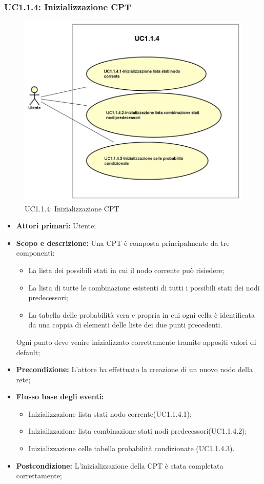 \subsubsection{UC1.1.4: Inizializzazione CPT} 
\begin{figure} [H]
	\centering
	\includegraphics[scale=0.45]{Img/UC1-1-4} 
	\caption{UC1.1.4: Inizializzazione CPT} \label{} 
\end{figure} 
\begin{itemize} 
	\item{\textbf{Attori primari:} Utente;} 
	\item{\textbf{Scopo e descrizione:} Una CPT è composta principalmente da tre componenti: 
		\begin{itemize} 
			\item{La lista dei possibili stati in cui il nodo corrente può risiedere;} 
			\item{La lista di tutte le combinazione esistenti di tutti i possibili stati dei nodi predecessori;} 
			\item{La tabella delle probabilità vera e propria in cui ogni cella è identificata da una coppia di elementi delle liste dei due punti precedenti.} 
		\end{itemize} 			
		Ogni punto deve venire inizializzato correttamente tramite appositi valori di default;
	} 
	\item{\textbf{Precondizione:} L'attore ha effettuato la creazione di un nuovo nodo della rete;} 
	\item{\textbf{Flusso base degli eventi:} } 
	\begin{itemize} 
		\item{Inizializzazione lista stati nodo corrente(UC1.1.4.1);} 
		\item{Inizializzazione lista combinazione stati nodi predecessori(UC1.1.4.2);} 
		\item{Inizializzazione celle tabella probabilità condizionate (UC1.1.4.3).} 
	\end{itemize} 
	\item{\textbf{Postcondizione:} L'inizializzazione della CPT è stata completata correttamente;} 
\end{itemize} 
